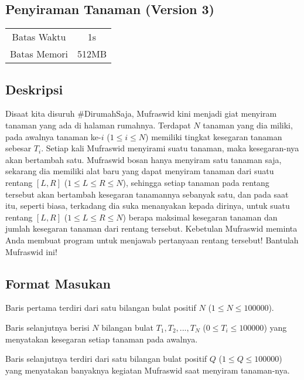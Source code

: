 \documentclass{article}
\begin{document}
\begin{center}
    \section*{Penyiraman Tanaman (Version 3)} %

    \begin{tabular}{ | c c | }
        \hline
        Batas Waktu  & 1s \\    %
        Batas Memori & 512MB \\  %
        \hline
    \end{tabular}
\end{center}

\subsection*{Deskripsi}
Disaat kita disuruh \#DirumahSaja, Mufraswid kini menjadi giat menyiram tanaman yang ada di halaman rumahnya. Terdapat $N$ tanaman yang dia miliki, pada awalnya tanaman ke-$i$ ($1 \leq i \leq N$) memiliki tingkat kesegaran tanaman sebesar $T_i$. Setiap kali Mufraswid menyirami suatu tanaman, maka kesegaran-nya akan bertambah satu. Mufraswid bosan hanya menyiram satu tanaman saja, sekarang dia memiliki alat baru yang dapat menyiram tanaman dari suatu rentang $\left[L, R \right]$ ($1 \leq L \leq R \leq N$), sehingga setiap tanaman pada rentang tersebut akan bertambah kesegaran tanamannya sebanyak satu, dan pada saat itu, seperti biasa, terkadang dia suka menanyakan kepada dirinya, untuk suatu rentang $\left[L, R \right]$ ($1 \leq L \leq R \leq N$) berapa maksimal kesegaran tanaman dan jumlah kesegaran tanaman dari rentang tersebut. Kebetulan Mufraswid meminta Anda membuat program untuk menjawab pertanyaan rentang tersebut! Bantulah Mufraswid ini!


\subsection*{Format Masukan}

Baris pertama terdiri dari satu bilangan bulat positif $N$ ($1 \leq N \leq 100000$).

Baris selanjutnya berisi $N$ bilangan bulat $T_1, T_2, ..., T_N$ ($0 \leq T_i \leq 100000$) yang menyatakan kesegaran setiap tanaman pada awalnya.

Baris selanjutnya terdiri dari satu bilangan bulat positif $Q$ ($1\leq Q\leq 100000$) yang menyatakan banyaknya kegiatan Mufraswid saat menyiram tanaman-nya.
\end{document}
